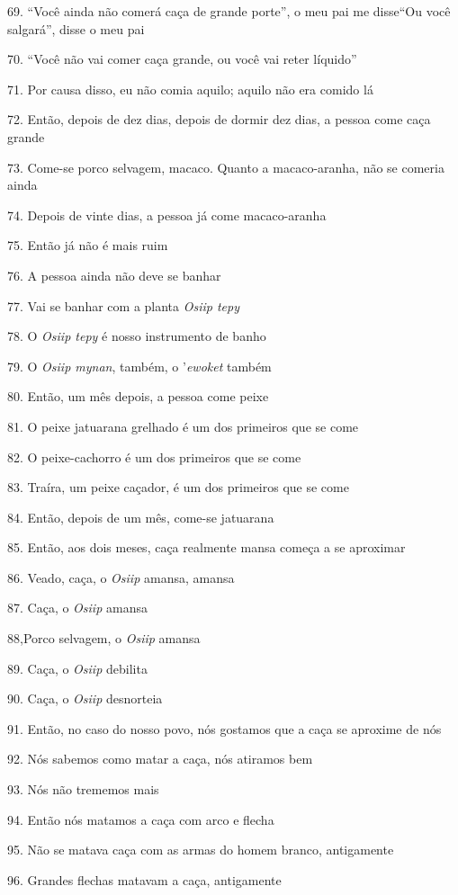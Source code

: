 69. ``Você ainda não comerá caça de grande porte'', o meu pai me
disse``Ou você salgará'', disse o meu pai

70. ``Você não vai comer caça grande, ou você vai reter líquido''

71. Por causa disso, eu não comia aquilo; aquilo não era comido lá

72. Então, depois de dez dias, depois de dormir dez dias, a pessoa come
caça grande

73. Come-se porco selvagem, macaco. Quanto a macaco-aranha, não se comeria ainda

74. Depois de vinte dias, a pessoa já come macaco-aranha

75. Então já não é mais ruim

76. A pessoa ainda não deve se banhar

77. Vai se banhar com a planta \emph{Osiip tepy}

78. O \emph{Osiip tepy} é nosso instrumento de banho

79. O \emph{Osiip mynan}, também, o '\emph{ewoket} também

80. Então, um mês depois, a pessoa come peixe

81. O peixe jatuarana grelhado é um dos primeiros que se come

82. O peixe-cachorro é um dos primeiros que se come

83. Traíra, um peixe caçador, é um dos primeiros que se come

84. Então, depois de um mês, come-se jatuarana

85. Então, aos dois meses, caça realmente mansa começa a se aproximar

86. Veado, caça, o \emph{Osiip} amansa, amansa

87. Caça, o \emph{Osiip} amansa

88,Porco selvagem, o \emph{Osiip} amansa

89. Caça, o \emph{Osiip} debilita

90. Caça, o \emph{Osiip} desnorteia

91. Então, no caso do nosso povo, nós gostamos que a caça se aproxime de nós

92. Nós sabemos como matar a caça, nós atiramos bem

93. Nós não trememos mais

94. Então nós matamos a caça com arco e flecha

95. Não se matava caça com as armas do homem branco, antigamente

96. Grandes flechas matavam a caça, antigamente

